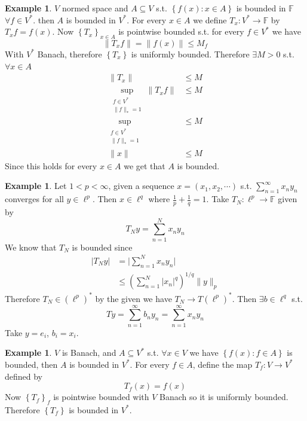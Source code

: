\documentclass[11pt,a4paper]{article}
\theoremstyle{definition}
\newtheorem{example}[definition]{Example}
\theoremstyle{plain}
\theoremstyle{remark}
\newcommand{\F}{\mathbb{F}}
\renewcommand{\set}[1]{\left\{ #1 \right\}}
\newcommand{\abs}[1]{\lvert #1 \rvert}
\newcommand{\norm}[1]{\lVert #1 \rVert}
\newcommand{\1}{\mathbbm{1}}
\begin{document}
\begin{example}
    $V$ normed space and $A \subseteq V$ s.t. $\set{f(x) \colon x \in A}$ is bounded in $\F$ $\forall f \in V^*$. then $A$ is bounded in $V^*$.
    For every $x \in A$ we define $T_x \colon V^* \to \F$ by $T_x f = f(x)$. Now $\set{T_x}_{x \in A}$ is pointwise bounded s.t. for every $f \in V^*$ we have 
    $$\norm{T_x f} = \norm{f(x)} \le M_f$$
    With $V^*$ Banach, therefore $\set{T_x}$ is uniformly bounded. Therefore $\exists M > 0$ s.t. $\forall x \in A$
    \begin{align*}
        \norm{T_x} &\le M \\
        \sup_{\substack{f \in V^* \\ \norm{f}_* = 1}} \norm{T_x f} &\le M \\
        \sup_{\substack{f \in V^* \\ \norm{f}_* = 1}} &\le M \\
        \norm{x} &\le M 
    \end{align*}
    Since this holds for every $x \in A$ we get that $A$ is bounded. 
\end{example}

\begin{example}
    Let $1 < p < \infty$, given a sequence $x = (x_1, x_2, \cdots)$ s.t. $\sum_{n=1}^\infty x_n y_n$ converges for all $y \in \ell^p$. Then $x \in \ell^q$ where $\frac{1}{p} + \frac{1}{q} = 1$. 
    Take $T_N \colon \ell^p \to \F$ given by 
    $$T_N y = \sum_{n=1}^N x_n y_n $$
    We know that $T_N$ is bounded since 
    \begin{align*}
        \abs{T_N y} &= \abs{\sum_{n=1}^N x_n y_n} \\
        &\le \left(\sum_{n=1}^N \abs{x_n}^q\right)^{1/q} \norm{y}_p 
    \end{align*}
    Therefore $T_N \in (\ell^p)^*$ by the given we have $T_N \to T (\ell^p)^*$. Then $\exists b \in \ell^q$ s.t. 
    $$Ty = \sum_{n=1}^\infty b_n y_n = \sum_{n=1}^\infty x_n y_n$$
    Take $y = e_i$, $b_i = x_i$. 
\end{example}

\begin{example}
    $V$ is Banach, and $A \subseteq V^*$ s.t. $\forall x \in V$ we have $\set{f(x) \colon f \in A}$ is bounded, then $A$ is bounded in $V^*$. 
    For every $f \in A$, define the map $T_f \colon V \to V^*$ defined by 
    $$T_f (x) = f(x)$$
    Now $\set{T_f}_f$ is pointwise bounded with $V$ Banach so it is uniformly bounded. Therefore $\set{T_f}$ is bounded in $V^*$.
\end{example}
\end{document}
